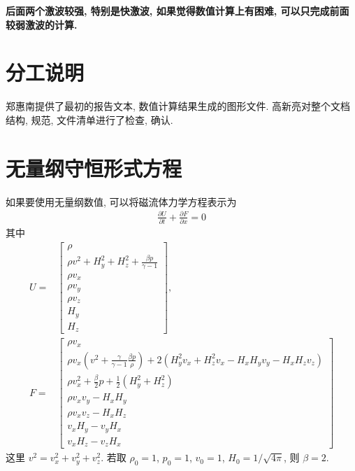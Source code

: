 \documentclass[10.5pt
]{article}
\begin{document}
\textbf{后面两个激波较强, 特别是快激波, 如果觉得数值计算上有困难, 可以只完成前面较弱激波的计算.}

\section{分工说明}

郑惠南提供了最初的报告文本, 数值计算结果生成的图形文件. 高新亮对整个文档结构, 规范, 文件清单进行了检查, 确认.

\section{无量纲守恒形式方程}\label{DLess}
如果要使用无量纲数值, 可以将磁流体力学方程表示为
\begin{align}
\frac{\partial U}{\partial t} + \frac{\partial F}{\partial x} = 0 \label{Eqn:MHD}
\end{align}
其中
\begin{align}
U = & \left[ \begin{array}{l}
\rho\\
\rho v^2 + H_y^2 + H_z^2 + \frac{\beta p}{\gamma -1}
\\
\rho v_x\\
\rho v_y\\
\rho v_z\\
H_y\\
H_z
\end{array} \right], \\
F = & \left[ \begin{array}{l}
\rho v_x\\
\rho v_x \left(v^2 + \frac{\gamma}{\gamma - 1} \frac{\beta p}{\rho} \right) + 2(H_y^2 v_x + H_z^2 v_x - H_x H_y v_y - H_x H_z v_z)
\\
\rho v_x^2 + \frac{\beta}{2} p + \frac{1}{2} (H_y^2 + H_z^2)\\
\rho v_x v_y - H_x H_y\\
\rho v_x v_z - H_x H_z\\
v_x H_y - v_y H_x\\
v_x H_z - v_z H_x
\end{array} \right] \label{Eqn:Flux}
\end{align}
这里 $v^2 = v_x^2 + v_y^2 + v_z^2$. 若取 $\rho_0 = 1$, $p_0 = 1$, $v_0 = 1$, $H_0 = 1/\sqrt{4\pi}$, 则 $\beta = 2$.
\end{document}
